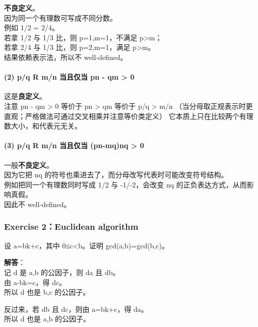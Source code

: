 \documentclass[
  11pt,
]{article}
\begin{document}
\textbf{不良定义}。\\
因为同一个有理数可写成不同分数。\\
例如 1/2 = 2/4。\\
若拿 1/2 与 1/3 比，则 p=1,m=1，不满足 p\textgreater m；\\
若拿 2/4 与 1/3 比，则 p=2,m=1，满足 p\textgreater m。\\
结果依赖表示法，所以不 well-defined。

\paragraph{(2) p/q R m/n 当且仅当 pn - qm \textgreater{}
0}\label{pq-r-mn-ux5f53ux4e14ux4ec5ux5f53-pn---qm-0}

这是\textbf{良定义}。\\
注意 pn - qm \textgreater{} 0 等价于 pn \textgreater{} qm 等价于 p/q
\textgreater{} m/n
（当分母取正规表示时更直观；严格做法可通过交叉相乘并注意等价类定义）
它本质上只在比较两个有理数大小，和代表元无关。

\paragraph{(3) p/q R m/n 当且仅当 (pn-mq)nq \textgreater{}
0}\label{pq-r-mn-ux5f53ux4e14ux4ec5ux5f53-pn-mqnq-0}

一般\textbf{不良定义}。\\
因为它把 nq 的符号也乘进去了，而分母改写代表时可能改变符号结构。\\
例如把同一个有理数同时写成 1/2 与 -1/-2，会改变 nq
的正负表达方式，从而影响真假。\\
因此不 well-defined。

\subsubsection{Exercise 2：Euclidean
algorithm}\label{exercise-2euclidean-algorithm}

设 a=bk+c，其中 0≤c\textless b。证明 gcd(a,b)=gcd(b,c)。

\textbf{解答}：\\
记 d 是 a,b 的公因子，则 d\textbar a 且 d\textbar b。\\
由 a-bk=c，得 d\textbar c。\\
所以 d 也是 b,c 的公因子。

反过来，若 d\textbar b 且 d\textbar c，则由 a=bk+c，得 d\textbar a。\\
所以 d 也是 a,b 的公因子。
\end{document}
